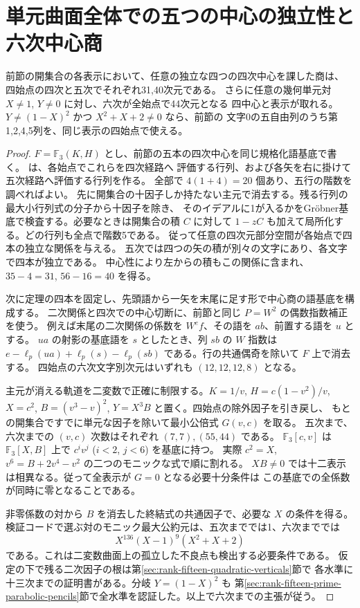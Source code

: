 \section{単元曲面全体での五つの中心の独立性と六次中心商}
\label{sec:rank-fifteen-bivariate-sixth-cut}
\begin{theorem}
前節の開集合の各表示において、任意の独立な四つの四次中心を課した商は、
四始点の四次と五次でそれぞれ31,40次元である。
さらに任意の幾何単元対 $X\ne1$, $Y\ne0$ に対し、六次が全始点で44次元となる
四中心と表示が取れる。$Y\ne(1-X)^2$ かつ $X^2+X+2\ne0$ なら、前節の
文字0の五自由列のうち第1,2,4,5列を、同じ表示の四始点で使える。
\end{theorem}
\begin{proof}
$F=\mathbb F_3(K,H)$ とし、前節の五本の四次中心を同じ規格化語基底で書く。
 は、各始点でこれらを四次経路へ
評価する行列、および各矢を右に掛けて五次経路へ評価する行列を作る。
全部で $4(1+4)=20$ 個あり、五行の階数を調べればよい。
先に開集合の十因子しか持たない主元で消去する。残る行列の最大小行列式の分子から十因子を除き、
そのイデアルに1が入るかをGröbner基底で検査する。必要なときは開集合の積 $C$ に対して
$1-zC$ も加えて局所化する。どの行列も全点で階数5である。
従って任意の四次元部分空間が各始点で四本の独立な関係を与える。
五次では四つの矢の積が別々の文字にあり、各文字で四本が独立である。
中心性により左からの積もこの関係に含まれ、$35-4=31$, $56-16=40$ を得る。

次に定理の四本を固定し、先頭語から一矢を末尾に足す形で中心商の語基底を構成する。
二次関係と四次での中心切断に、前節と同じ $P=W^2$ の偶数指数補正を使う。
例えば末尾の二次関係の係数を $W^e f$、その語を $ab$、前置する語を $u$ とする。
$ua$ の射影の基底語を $s$ としたとき、列 $sb$ の $W$ 指数は
$e-\ell_p(ua)+\ell_p(s)-\ell_p(sb)$ である。行の共通偶奇を除いて $F$ 上で消去する。
四始点の六次文字別次元はいずれも $(12,12,12,8)$ となる。

主元が消える軌道を二変数で正確に制限する。$K=1/v$, $H=c(1-v^2)/v$,
$X=c^2$, $B=(v^3-v)^2$, $Y=X^3B$ と置く。四始点の除外因子を引き戻し、
もとの開集合ですでに単元な因子を除いて最小公倍式 $G(v,c)$ を取る。
五次まで、六次までの $(v,c)$ 次数はそれぞれ $(7,7),(55,44)$ である。
$\mathbb F_3[c,v]$ は $\mathbb F_3[X,B]$ 上で $c^i v^j$ ($i<2$, $j<6$) を基底に持つ。
実際 $c^2=X$, $v^6=B+2v^4-v^2$ の二つのモニックな式で順に割れる。
$XB\ne0$ では十二表示は相異なる。従って全表示が $G=0$ となる必要十分条件は
この基底での全係数が同時に零となることである。

非零係数の対から $B$ を消去した終結式の共通因子で、必要な $X$ の条件を得る。
検証コードで選ぶ対のモニック最大公約元は、五次まででは1、六次まででは
\[
                     X^{136}(X-1)^9(X^2+X+2)
\]
である。これは二変数曲面上の孤立した不良点も検出する必要条件である。
仮定の下で残る二次因子の根は第\ref{sec:rank-fifteen-quadratic-verticals}節で
各水準に十三次までの証明書がある。分岐 $Y=(1-X)^2$ も
第\ref{sec:rank-fifteen-prime-parabolic-pencils}節で全水準を認証した。以上で六次までの主張が従う。
\end{proof}
